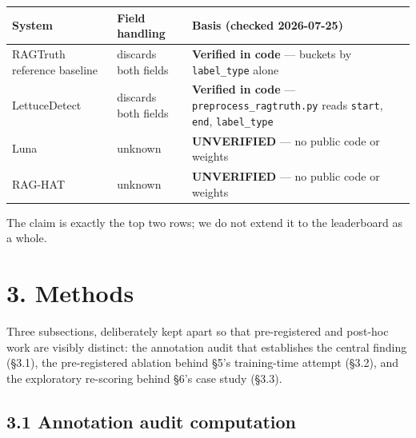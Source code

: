 \documentclass[11pt]{article}
\newcounter{none}
\begin{document}
{\def\LTcaptype{none} %
\begin{longtable}[]{@{}
  >{\raggedright\arraybackslash}p{}
  >{\raggedright\arraybackslash}p{}
  >{\raggedright\arraybackslash}p{}@{}}
\toprule\noalign{}
\begin{minipage}[b]{\linewidth}\raggedright
System
\end{minipage} & \begin{minipage}[b]{\linewidth}\raggedright
Field handling
\end{minipage} & \begin{minipage}[b]{\linewidth}\raggedright
Basis (checked 2026-07-25)
\end{minipage} \\
\midrule\noalign{}
\endhead
\bottomrule\noalign{}
\endlastfoot
RAGTruth reference baseline & discards both fields & \textbf{Verified in code} --- buckets by \texttt{label\_type} alone \\
LettuceDetect & discards both fields & \textbf{Verified in code} --- \texttt{preprocess\_ragtruth.py} reads \texttt{start}, \texttt{end}, \texttt{label\_type} \\
Luna & unknown & \textbf{UNVERIFIED} --- no public code or weights \\
RAG-HAT & unknown & \textbf{UNVERIFIED} --- no public code or weights \\
\end{longtable}
}

The claim is exactly the top two rows; we do not extend it to the leaderboard as a whole.

\section{3. Methods}\label{methods}

Three subsections, deliberately kept apart so that pre-registered and post-hoc work are
visibly distinct: the annotation audit that establishes the central finding (§3.1), the
pre-registered ablation behind §5's training-time attempt (§3.2), and the exploratory
re-scoring behind §6's case study (§3.3).

\subsection{3.1 Annotation audit computation}\label{annotation-audit-computation}
\end{document}
